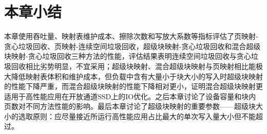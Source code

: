 \section{本章小结}

本章使用吞吐量、映射表维护成本、擦除次数和写放大系数等指标评估了页映射-贪心垃圾回收、页映射-连续空间垃圾回收，超级块映射-贪心垃圾回收和混合超级块映射-贪心垃圾回收三种方法的性能，评估结果表明连续空间垃圾回收与贪心垃圾回收相比劣势明显，不宜采用；超级块映射、混合超级块映射与页映射相比能极大降低映射表体积和维护成本，但负载中含有大量小于块大小的写入时超级块映射的性能下降严重，而混合超级块映射的性能下降相对更小，证明混合超级块映射更适用于高性能应用在开放通道SSD上的IO优化。之后本章讨论了设备容量和块内页数对不同方法性能的影响。最后本章讨论了超级块映射的重要参数——超级块大小的选取原则：应尽量接近所运行高性能应用占比最大的单次写入量大小但不能超过。
